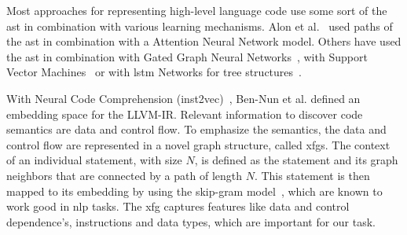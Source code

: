 Most approaches for representing high-level language code use some sort of the \ac{ast} in combination with various learning mechanisms.
Alon et al.~\cite{alon2019code2vec} used paths of the \ac{ast} in combination with a Attention Neural Network model.
Others have used the \ac{ast} in combination with Gated Graph Neural Networks~\cite{ye2020deep, allamanis2017learning}, with Support Vector Machines~\cite{park2012using} or with \ac{lstm} Networks for tree structures~\cite{dam2018deep}.

With Neural Code Comprehension (inst2vec)~\cite{ben2018neural}, Ben-Nun et al. defined an embedding space for the LLVM-IR.
Relevant information to discover code semantics are data and control flow. 
To emphasize the semantics, the data and control flow are represented in a novel graph structure, called \acp{xfg}.
The context of an individual statement, with size $N$, is defined as the statement and its graph neighbors that are connected by a path of length $N$.
This statement is then mapped to its embedding by using the skip-gram model~\cite{mikolov2013distributed}, which are known to work good in \ac{nlp} tasks.
The \ac{xfg} captures features like data and control dependence's, instructions and data types, which are important for our task.

